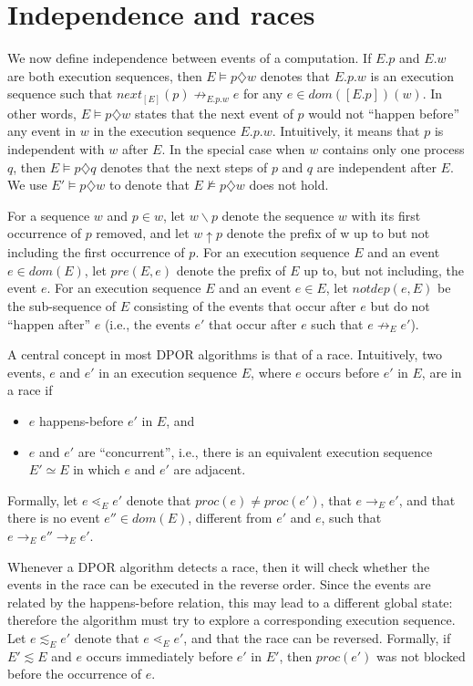 \section{Independence and races}

We now define independence between events of a computation. If
$E.p$ and $E.w$ are both execution sequences, then $E \models p\diamondsuit w$ denotes
that $E.p.w$ is an execution sequence such that $next_{[E]}(p) \not \rightarrow_{E.p.w} e$
for any $e \in dom([E.p])(w)$. In other words, $E \models p \diamondsuit w$ states that
the next event of $p$ would not “happen before” any event in $w$
in the execution sequence $E.p.w$. Intuitively, it means that $p$ is
independent with $w$ after $E$. In the special case when $w$ contains
only one process $q$, then $E \models p \diamondsuit q$ denotes that the next steps of
$p$ and $q$ are independent after $E$. We use $E'\models p \diamondsuit w$ to denote that
$E \not \models p \diamondsuit w$ does not hold.

For a sequence $w$ and $p \in w$, let $w \backslash p$ denote the sequence
$w$ with its first occurrence of $p$ removed, and let $w \uparrow p$ denote the
prefix of w up to but not including the first occurrence of $p$. For
an execution sequence $E$ and an event $e \in  dom(E)$, let $pre(E,e)$
denote the prefix of $E$ up to, but not including, the event $e$. For an
execution sequence $E$ and an event $e \in E$, let $notdep(e, E)$ be the
sub-sequence of $E$ consisting of the events that occur after $e$ but do
not “happen after” $e$ (i.e., the events $e'$ that occur after $e$ such that
$e \not \rightarrow_E e'$).


A central concept in most DPOR algorithms is that of a race.
Intuitively, two events, $e$ and $e'$ in an execution sequence $E$, where
$e$ occurs before $e'$ in $E$, are in a race if
\begin{itemize}
\item $e$ happens-before $e'$ in $E$, and
\item $e$ and $e'$ are “concurrent”, i.e., there is an equivalent execution
sequence $E' \simeq E$ in which $e$ and $e'$ are adjacent.
\end{itemize}
Formally, let $e \lessdot_E e'$ denote that $proc(e) \not = proc(e')$, that $e \rightarrow_E e'$,
and that there is no event $e'' \in dom(E)$, different from $e'$ and $e$,
such that $e \rightarrow_E e'' \rightarrow_E e'$.

Whenever a DPOR algorithm detects a race, then it will check
whether the events in the race can be executed in the reverse order.
Since the events are related by the happens-before relation, this may
lead to a different global state: therefore the algorithm must try to
explore a corresponding execution sequence. Let $e \lesssim_E e'$ denote
that $e \lessdot_E e'$, and that the race can be reversed. Formally, if $E' \lesssim E$
and $e$ occurs immediately before $e'$ in $E'$, then $proc(e')$ was not
blocked before the occurrence of $e$.


